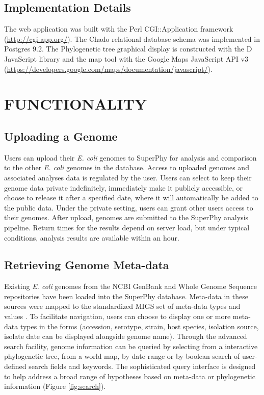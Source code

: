 \documentclass[a4paper,twoside]{article}
\begin{document}
\subsection{Implementation Details}

The web application was built with the Perl CGI::Application framework (\url{http://cgi-app.org/}). The Chado relational database schema was implemented in Postgres 9.2. The Phylogenetic tree graphical display is constructed with the D JavaScript library \cite{bostock2011d3} and the map tool with the Google Maps JavaScript API v3 (\url{https://developers.google.com/maps/documentation/javascript/}).

\section{\uppercase{Functionality}}
\label{sec:functionality}

\subsection{Uploading a Genome}

Users can upload their \textit{E. coli} genomes to SuperPhy for analysis and comparison to the other \textit{E. coli} genomes in the database.  Access to uploaded genomes and associated analyses data is regulated by the user. Users can select to keep their genome data private indefinitely, immediately make it publicly accessible, or choose to release it after a specified date, where it will automatically be added to the public data.  Under the private setting, users can grant other users access to their genomes. After upload, genomes are submitted to the SuperPhy analysis pipeline. Return times for the results depend on server load, but under typical conditions, analysis results are available within an hour.

\subsection{Retrieving Genome Meta-data}

Existing \textit{E. coli} genomes from the NCBI GenBank and Whole Genome Sequence repositories \cite{benson2013genbank} have been loaded into the SuperPhy database. Meta-data in these sources were mapped to the standardized MIGS set of meta-data types and values \cite{field2008}. To facilitate navigation, users can choose to display one or more meta-data types in the forms (accession, serotype, strain, host species, isolation source, isolate date can be displayed alongside genome name). Through the advanced search facility, genome information can be queried by selecting from a interactive phylogenetic tree, from a world map, by date range or by boolean search of user-defined search fields and keywords.  The sophisticated query interface is designed to help address a broad range of hypotheses based on meta-data or phylogenetic information (Figure \ref{fig:search}).
\end{document}
